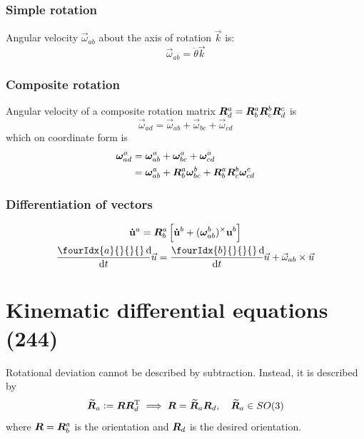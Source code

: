 \documentclass[a4paper, 12pt]{article}
\begin{document}
\subsubsection{Simple rotation}
Angular velocity \( \vec{\omega}_{ab} \) about the axis of rotation \( \vec{k} \) is:
\begin{equation}
	\vec{\omega}_{ab} = \dot{\theta} \vec{k}
\end{equation}

\subsubsection{Composite rotation}
Angular velocity of a composite rotation matrix \( \bm{R}^a_d = \bm{R}^a_b \bm{R}^b_c \bm{R}^c_d \)  is
\begin{equation}
	\vec{\omega}_{ad} = \vec{\omega}_{ab} + \vec{\omega}_{bc} + \vec{\omega}_{cd}
\end{equation}
which on coordinate form is
\begin{equation}
	\begin{aligned}
		\boldsymbol{\omega}^a_{ad} &= \boldsymbol{\omega}^a_{ab} +        \boldsymbol{\omega}^a_{bc} +        \boldsymbol{\omega}^a_{cd} \\
		               &= \boldsymbol{\omega}^a_{ab} + \bm{R}^a_b \boldsymbol{\omega}^b_{bc} + \bm{R}^a_b \bm{R}^b_c \boldsymbol{\omega}^c_{cd} \\
	\end{aligned}
\end{equation}

\subsubsection{Differentiation of vectors}
\begin{gather}
	\V{\dot{u}}^a = \R^a_b \left[ \V{\dot{u}}^b + (\angvel^b_{ab})^\times \V{u}^b \right] \\
	\frac{\fourIdx{a}{}{}{}\dif}{\dif t} \vec{u} = \frac{\fourIdx{b}{}{}{}\dif}{\dif t} \vec{u} + \vec{\omega}_{ab} \times \vec{u}
\end{gather}

\section{Kinematic differential equations (244)}
Rotational deviation cannot be described by subtraction. Instead, it is described by
\begin{equation}
	\widetilde{\bm{R}}_a := \bm{R} \bm{R}_d^{\text{T}} \implies \bm{R} = \widetilde{\bm{R}}_a \bm{R}_d
	, \quad \widetilde{\bm{R}}_a \in SO(3)
\end{equation}
where \( \bm{R} = \bm{R}^a_b \) is the orientation and \( \bm{R}_d \) is the desired orientation.
\end{document}
